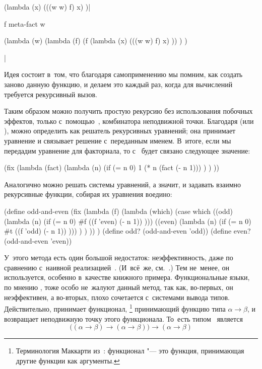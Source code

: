 \begin{code:lisp}
(lambda (x)
  (((w w) f) x) )|\begin{where}
                  \- f {\eq} meta-fact
                  \- w {\is} \begin{complex}
                            \-(lambda (w)
                            \-  (lambda (f)
                            \-    (f (lambda (x)
                            \-         (((w w) f) x) )) ) )
                            \end{complex}
                  \end{where}|
\end{code:lisp}

Идея состоит в~том, что благодаря самоприменению мы помним, как создать заново
данную функцию, и делаем это каждый раз, когда для вычислений требуется
рекурсивный вызов.

Таким образом можно получить простую рекурсию без использования побочных
эффектов, только с~помощью~, комбинатора неподвижной точки. Благодаря
 (или ),  можно определить как решатель рекурсивных
уравнений; она принимает уравнение и связывает решение с~переданным именем.
В~итоге, если мы передадим  уравнение для факториала, то с~
будет связано следующее значение:

\begin{code:lisp}
(fix (lambda (fact)
       (lambda (n)
         (if (= n 0) 1
             (* n (fact (- n 1))) ) ) ))
\end{code:lisp}

Аналогично можно решать системы уравнений, а значит, и задавать взаимно
рекурсивные функции, собирая их уравнения воедино:

\begin{code:lisp}
(define odd-and-even
  (fix (lambda (f)
         (lambda (which)
           (case which
             ((odd) (lambda (n) (if (= n 0) #f
                                    ((f 'even) (- n 1)) )))
             ((even) (lambda (n) (if (= n 0) #t
                                     ((f 'odd) (- n 1)) ))) ) ) )) )
(define odd? (odd-and-even 'odd))
(define even? (odd-and-even 'even))
\end{code:lisp}

У~этого метода есть один большой недостаток: неэффективность, даже по сравнению
с~наивной реализацией~. (И~всё~же, см.~\cite{roz92,ser93}.) Тем
не~менее, он используется, особенно в~качестве книжного примера. Функциональные
языки, по мнению \cite{pj87}, тоже особо не~жалуют данный метод, так как,
во-первых, он неэффективен, а во-вторых,  плохо сочетается с~системами
вывода типов. Действительно,  принимает функционал,%
\footnote*{Терминология Маккарти из~\cite{mae+62}: функционал "--- это функция,
принимающая другие функции как аргументы.} принимающий функцию типа $\alpha \to
\beta$, и возвращает неподвижную точку этого функционала. То~есть типом~
является
%
\[ \big((\alpha \to \beta) \to (\alpha \to \beta)\big) \to (\alpha \to \beta) \]

